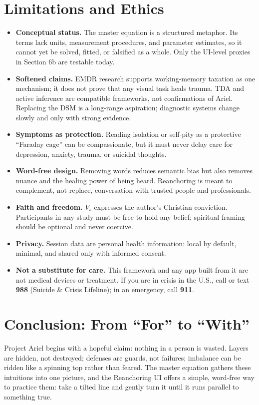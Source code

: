 \documentclass[11pt]{article}
\begin{document}
\section{Limitations and Ethics}
\begin{itemize}[leftmargin=1.2em]
\item \textbf{Conceptual status.} The master equation is a structured metaphor. Its terms lack units, measurement procedures, and parameter estimates, so it cannot yet be solved, fitted, or falsified as a whole. Only the UI-level proxies in Section 6b are testable today.
\item \textbf{Softened claims.} EMDR research supports working-memory taxation as one mechanism; it does not prove that any visual task heals trauma. TDA and active inference are compatible frameworks, not confirmations of Ariel. Replacing the DSM is a long-range aspiration; diagnostic systems change slowly and only with strong evidence.
\item \textbf{Symptoms as protection.} Reading isolation or self-pity as a protective ``Faraday cage'' can be compassionate, but it must never delay care for depression, anxiety, trauma, or suicidal thoughts.
\item \textbf{Word-free design.} Removing words reduces semantic bias but also removes nuance and the healing power of being heard. Reanchoring is meant to complement, not replace, conversation with trusted people and professionals.
\item \textbf{Faith and freedom.} $V_s$ expresses the author's Christian conviction. Participants in any study must be free to hold any belief; spiritual framing should be optional and never coercive.
\item \textbf{Privacy.} Session data are personal health information: local by default, minimal, and shared only with informed consent.
\item \textbf{Not a substitute for care.} This framework and any app built from it are not medical devices or treatment. If you are in crisis in the U.S., call or text \textbf{988} (Suicide \& Crisis Lifeline); in an emergency, call \textbf{911}.
\end{itemize}

\section{Conclusion: From ``For'' to ``With''}
Project Ariel begins with a hopeful claim: nothing in a person is wasted. Layers are hidden, not destroyed; defenses are guards, not failures; imbalance can be ridden like a spinning top rather than feared. The master equation gathers these intuitions into one picture, and the Reanchoring UI offers a simple, word-free way to practice them: take a tilted line and gently turn it until it runs parallel to something true.
\end{document}

